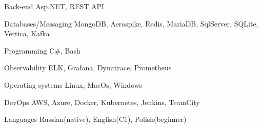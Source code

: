 

\begin{cvskills}

  \cvskill
    {Back-end} %
    {Asp.NET, REST API} %

  \cvskill
    {Databases/Messaging} %
    {MongoDB, Aerospike, Redis, MariaDB, SqlServer, SQLite, Vertica, Kafka} %

  \cvskill
    {Programming} %
    {C\#, Bash} %

  \cvskill
    {Observability} %
    {ELK, Grafana, Dynatrace, Prometheus} %

  \cvskill
    {Operating systems} %
    {Linux, MacOs, Windows} %

  \cvskill
    {DevOps} %
    {AWS, Azure, Docker, Kubernetes, Jenkins, TeamCity} %

  \cvskill
    {Languages} %
    {Russian(native), English(C1), Polish(beginner)} %

\end{cvskills}
